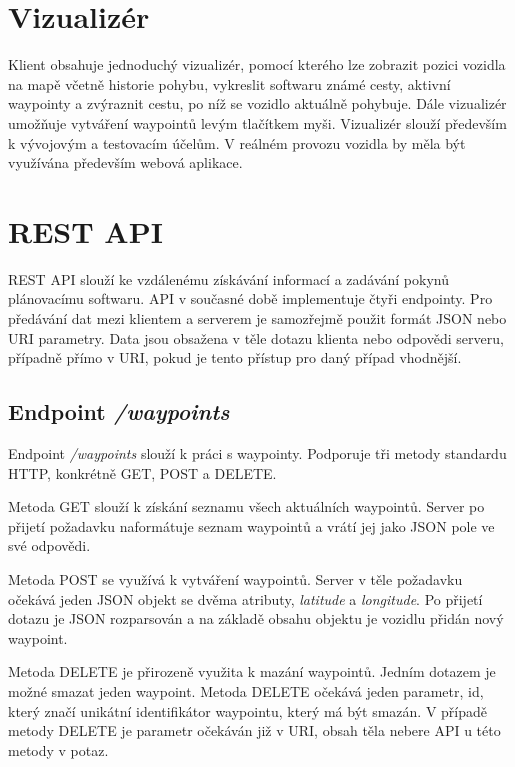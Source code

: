 \documentclass[czech, bachelor]{diploma}
\begin{document}
\section{Vizualizér} \label{visualizer}

Klient obsahuje jednoduchý vizualizér, pomocí kterého lze zobrazit pozici vozidla na mapě včetně historie pohybu, vykreslit
softwaru známé cesty, aktivní waypointy a zvýraznit cestu, po níž se vozidlo aktuálně pohybuje. Dále vizualizér umožňuje vytváření
waypointů levým tlačítkem myši. Vizualizér slouží především k vývojovým a testovacím účelům. V reálném provozu vozidla by měla
být využívána především webová aplikace.

\section{REST API} \label{rest-api}

REST API slouží ke vzdálenému získávání informací a zadávání pokynů plánovacímu softwaru. API v současné době implementuje čtyři
endpointy. Pro předávání dat mezi klientem a serverem je samozřejmě použit formát JSON nebo URI parametry. Data jsou obsažena
v těle dotazu klienta nebo odpovědi serveru, případně přímo v URI, pokud je tento přístup pro daný případ vhodnější.

\subsection{Endpoint \emph{/waypoints}}

Endpoint \emph{/waypoints} slouží k práci s waypointy. Podporuje tři metody standardu HTTP, konkrétně GET, POST a DELETE.

Metoda GET slouží k získání seznamu všech aktuálních waypointů. Server po přijetí požadavku naformátuje seznam waypointů a vrátí
jej jako JSON pole ve své odpovědi.

Metoda POST se využívá k vytváření waypointů. Server v těle požadavku očekává jeden JSON objekt se dvěma atributy, \emph{latitude}
a \emph{longitude}. Po přijetí dotazu je JSON rozparsován a na základě obsahu objektu je vozidlu přidán nový waypoint.

Metoda DELETE je přirozeně využita k mazání waypointů. Jedním dotazem je možné smazat jeden waypoint. Metoda DELETE očekává jeden
parametr, id, který značí unikátní identifikátor waypointu, který má být smazán. V případě metody DELETE je parametr očekáván již 
v URI, obsah těla nebere API u této metody v potaz.
\end{document}
